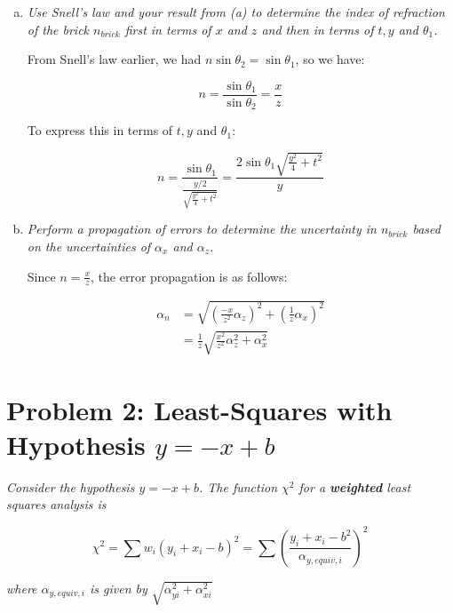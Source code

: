 \documentclass{article}
\theoremstyle{definition}
\numberwithin{equation}{section}
\numberwithin{definition}{section}
\begin{document}
\begin{enumerate}[a)]
\item \textit{Use Snell's law and your result from (a) to determine the index of refraction of the brick $n_{brick}$ first in terms of $x$ and $z$ and then in terms of $t, y$ and $\theta_1$.}

From Snell's law earlier, we had $n \sin \theta_2 = \sin \theta_1$, so we have:

\[ n = \frac{\sin \theta_1}{\sin\theta_2} = \frac{x}{z}\]

To express this in terms of $t, y$ and $\theta_1$:

\[ n = \frac{\sin\theta_1}{\frac{y/2}{\sqrt{\frac{y^2}{4} + t^2}}} = \frac{2\sin \theta_1 \sqrt{\frac{y^2}{4} + t^2}}{y}\]


\item \textit{Perform a propagation of errors to determine the uncertainty in $n_{brick}$ based on the uncertainties of $\alpha_x$ and $\alpha_z$.}

Since $n = \frac{x}{z}$, the error propagation is as follows: 

\begin{align*} 
    \alpha_n &= \sqrt{\left(\frac{-x}{z^2}\alpha_z\right)^2 + \left(\frac{1}{z} \alpha_x\right)^2}\\
    &= \frac{1}{z} \sqrt{\frac{x^2}{z^2}\alpha_z^2+ \alpha_x^2}
\end{align*}
\end{enumerate}

\section*{Problem 2: Least-Squares with Hypothesis $y = -x + b$}

\textit{Consider the hypothesis $y = -x + b$. The function $\chi^2$ for a \textbf{weighted} least squares analysis is }

\[ \chi^2 = \sum w_i(y_i + x_i - b)^2 = \sum \left(\frac{y_i +x_i - b^2}{\alpha_{y, equiv, i}}\right)^2\]

\textit{where $\alpha_{y, equiv, i}$ is given by $\sqrt{\alpha_{yi}^2 + \alpha_{xi}^2}$}
\end{document}
